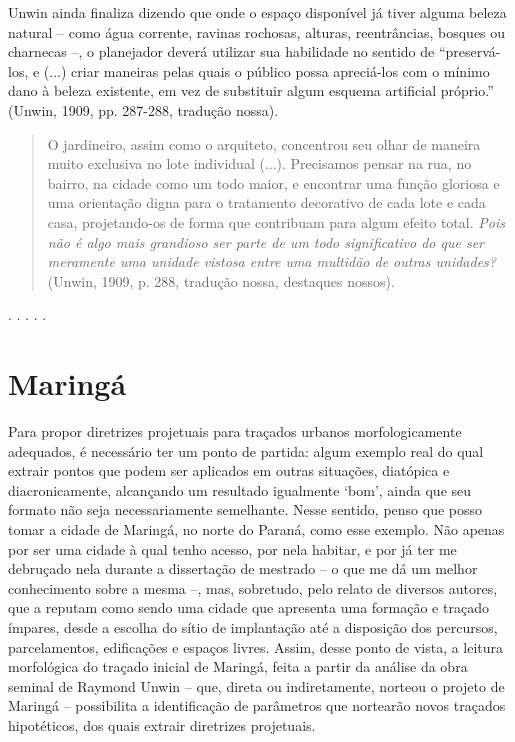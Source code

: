 \documentclass[12pt, a4paper]{book} %
\begin{document}
        Unwin ainda finaliza dizendo que onde o espaço disponível já tiver alguma beleza natural – como água corrente, ravinas rochosas, alturas, reentrâncias, bosques ou charnecas –, o planejador deverá utilizar sua habilidade no sentido de ``preservá-los, e (...) criar maneiras pelas quais o público possa apreciá-los com o mínimo dano à beleza existente, em vez de substituir algum esquema artificial próprio.'' (Unwin, 1909, pp. 287-288, tradução nossa).

        \begin{quotation}
            O jardineiro, assim como o arquiteto, concentrou seu olhar de maneira muito exclusiva no lote individual (...). Precisamos pensar na rua, no bairro, na cidade como um todo maior, e encontrar uma função gloriosa e uma orientação digna para o tratamento decorativo de cada lote e cada casa, projetando-os de forma que contribuam para algum efeito total. \textit{Pois não é algo mais grandioso ser parte de um todo significativo do que ser meramente uma unidade vistosa entre uma multidão de outras unidades?} (Unwin, 1909, p. 288, tradução nossa, destaques nossos).
        \end{quotation}
        

        \begin{center}
            . . . . .
        \end{center} 



            \section{Maringá}

        Para propor diretrizes projetuais para traçados urbanos morfologicamente adequados, é necessário ter um ponto de partida: algum exemplo real do qual extrair pontos que podem ser aplicados em outras situações, diatópica e diacronicamente, alcançando um resultado igualmente `bom', ainda que seu formato não seja necessariamente semelhante. Nesse sentido, penso que posso tomar a cidade de Maringá, no norte do Paraná, como esse exemplo. Não apenas por ser uma cidade à qual tenho acesso, por nela habitar, e por já ter me debruçado nela durante a dissertação de mestrado – o que me dá um melhor conhecimento sobre a mesma –, mas, sobretudo, pelo relato de diversos autores, que a reputam como sendo uma cidade que apresenta uma formação e traçado ímpares, desde a escolha do sítio de implantação até a disposição dos percursos, parcelamentos, edificações e espaços livres. Assim, desse ponto de vista, a leitura morfológica do traçado inicial de Maringá, feita a partir da análise da obra seminal de Raymond Unwin – que, direta ou indiretamente, norteou o projeto de Maringá – possibilita a identificação de parâmetros que nortearão novos traçados hipotéticos, dos quais extrair diretrizes projetuais.
\end{document}
